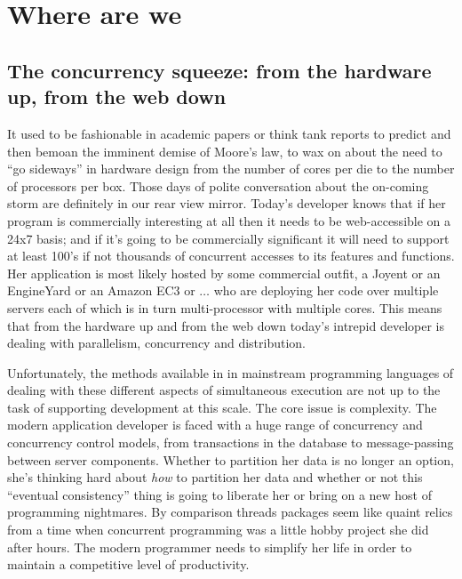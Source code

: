 \section{Where are we}

\subsection{The concurrency squeeze: from the hardware up, from the web down}

It used to be fashionable in academic papers or think tank reports to
predict and then bemoan the imminent demise of Moore's law, to wax on
about the need to ``go sideways'' in hardware design from the number
of cores per die to the number of processors per box. Those days of
polite conversation about the on-coming storm are definitely in our
rear view mirror. Today's developer knows that if her program is
commercially interesting at all then it needs to be web-accessible on
a 24x7 basis; and if it's going to be commercially significant it will
need to support at least 100's if not thousands of concurrent accesses
to its features and functions. Her application is most likely hosted
by some commercial outfit, a Joyent or an EngineYard or an Amazon EC3
or $\ldots$ who are deploying her code over multiple servers each of
which is in turn multi-processor with multiple cores. This means that
from the hardware up and from the web down today's intrepid developer
is dealing with parallelism, concurrency and distribution.

Unfortunately, the methods available in in mainstream programming
languages of dealing with these different aspects of simultaneous
execution are not up to the task of supporting development at this
scale. The core issue is complexity. The modern application developer
is faced with a huge range of concurrency and concurrency control
models, from transactions in the database to message-passing between
server components. Whether to partition her data is no longer an
option, she's thinking hard about \emph{how} to partition her data and
whether or not this ``eventual consistency'' thing is going to
liberate her or bring on a new host of programming nightmares. By
comparison threads packages seem like quaint relics from a time when
concurrent programming was a little hobby project she did after
hours. The modern programmer needs to simplify her life in order to
maintain a competitive level of productivity.

